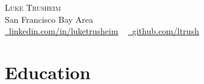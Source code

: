 \documentclass[letterpaper,11pt]{article}
\newcommand{\resumeSubHeadingListStart}{\begin{itemize}[leftmargin=0.0in, label={}]}
\newcommand{\resumeSubHeadingListEnd}{\end{itemize}}
\begin{document}

\begin{center}
    {\Huge \scshape Luke Trusheim} \\ \vspace{1pt}
    San Francisco Bay Area \\ \vspace{1pt}
    \small 
    \href{https://www.linkedin.com/in/luketrusheim/}{\raisebox{-0.2\height}\faLinkedin\ \underline{linkedin.com/in/luketrusheim}}  ~
    \href{https://github.com/ltrush}{\raisebox{-0.2\height}\faGithub\ \underline{github.com/ltrush}}
    \vspace{-8pt}
\end{center}


\section{Education}
  \resumeSubHeadingListStart
    
  \resumeSubHeadingListEnd

\end{document}
